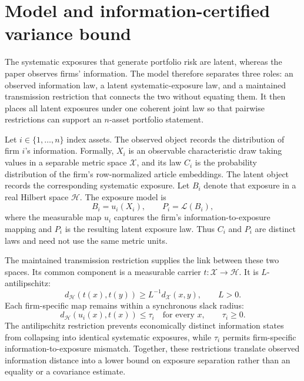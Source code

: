 \section{Model and information-certified variance bound}
\label{sec:model}\label{sec:certificate}

The systematic exposures that generate portfolio risk are latent, whereas the
paper observes firms' information.
The model therefore separates three roles: an observed information law, a
latent systematic-exposure law, and a maintained transmission restriction that
connects the two without equating them.
It then places all latent exposures under one coherent joint law so that
pairwise restrictions can support an $n$-asset portfolio statement.

Let $i\in\{1,\ldots,n\}$ index assets.
The observed object records the distribution of firm $i$'s information.
Formally, $X_i$ is an observable characteristic draw taking values in a
separable metric space $\mathcal X$, and its law $C_i$ is the probability
distribution of the firm's row-normalized article embeddings.
The latent object records the corresponding systematic exposure.
Let $B_i$ denote that exposure in a real Hilbert space $\mathcal H$.
The exposure model is
\begin{equation}\label{eq:p3-exposure-model}
  B_i=u_i(X_i),
  \qquad P_i=\mathcal L(B_i),
\end{equation}
where the measurable map $u_i$ captures the firm's information-to-exposure
mapping and $P_i$ is the resulting latent exposure law.
Thus $C_i$ and $P_i$ are distinct laws and need not use the same metric units.

The maintained transmission restriction supplies the link between these two
spaces.
Its common component is a measurable carrier
$t:\mathcal X\to\mathcal H$.
It is $L$-antilipschitz:
\begin{equation}\label{eq:p3-antilipschitz}
  d_{\mathcal H}(t(x),t(y))
  \ge L^{-1}d_{\mathcal X}(x,y),
  \qquad L>0.
\end{equation}
Each firm-specific map remains within a synchronous slack radius:
\begin{equation}\label{eq:p3-synchronous-slack}
  d_{\mathcal H}(u_i(x),t(x))\le\tau_i
  \quad\text{for every }x,
  \qquad \tau_i\ge0.
\end{equation}
The antilipschitz restriction prevents economically distinct information states
from collapsing into identical systematic exposures, while $\tau_i$ permits
firm-specific information-to-exposure mismatch.
Together, these restrictions translate observed information distance into a
lower bound on exposure separation rather than an equality or a covariance
estimate.

